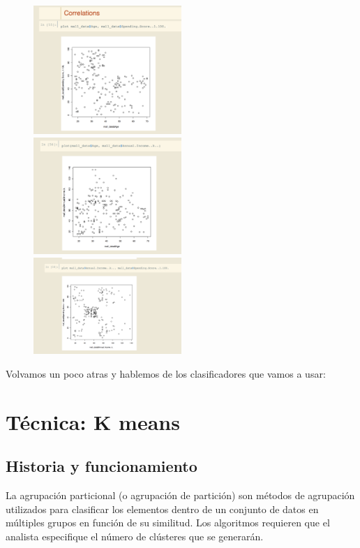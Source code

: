 \documentclass[12pt, fleqn]{report}                             %
\theoremstyle{break}                                            %
\begin{document}
                \begin{figure}[ht!]
                    \centering
                    \includegraphics[width=0.5\textwidth]{9}
                    \includegraphics[width=0.5\textwidth]{91}
                    \includegraphics[width=0.5\textwidth]{92}
                \end{figure}

            Volvamos un poco atras y hablemos de los clasificadores que vamos a usar:

    \clearpage
    \section{Técnica: K means}
        \subsection{Historia y funcionamiento}
        La agrupación particional (o agrupación de partición) son métodos de agrupación 
        utilizados para clasificar los elementos dentro de un conjunto de datos en múltiples grupos en función de su similitud. 
        Los algoritmos requieren que el analista especifique el número de clústeres que se generarán.
\end{document}
